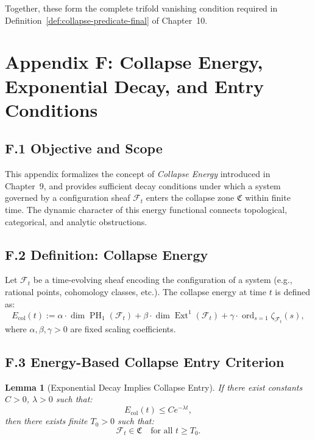 \documentclass[11pt]{article}
\newtheorem{lemma}[theorem]{Lemma}
\DeclareMathOperator{\Ext}{Ext}
\DeclareMathOperator{\PH}{PH}
\newcommand{\ord}{\operatorname{ord}}
\begin{document}
Together, these form the complete trifold vanishing condition required in Definition~\ref{def:collapse-predicate-final} of Chapter~10.



\appendix
\section*{Appendix F: Collapse Energy, Exponential Decay, and Entry Conditions}

\subsection*{F.1 Objective and Scope}

This appendix formalizes the concept of \emph{Collapse Energy} introduced in Chapter~9, and provides sufficient decay conditions under which a system governed by a configuration sheaf \( \mathcal{F}_t \) enters the collapse zone \( \mathfrak{C} \) within finite time. The dynamic character of this energy functional connects topological, categorical, and analytic obstructions.

\subsection*{F.2 Definition: Collapse Energy}

Let \( \mathcal{F}_t \) be a time-evolving sheaf encoding the configuration of a system (e.g., rational points, cohomology classes, etc.). The collapse energy at time \( t \) is defined as:
\[
E_{\mathrm{col}}(t) := \alpha \cdot \dim \PH_1(\mathcal{F}_t) + \beta \cdot \dim \Ext^1(\mathcal{F}_t) + \gamma \cdot \ord_{s=1} \zeta_{\mathcal{F}_t}(s),
\]
where \( \alpha, \beta, \gamma > 0 \) are fixed scaling coefficients.

\subsection*{F.3 Energy-Based Collapse Entry Criterion}

\begin{lemma}[Exponential Decay Implies Collapse Entry]
\label{lem:collapse-energy-decay}
If there exist constants \( C > 0 \), \( \lambda > 0 \) such that:
\[
E_{\mathrm{col}}(t) \leq C e^{-\lambda t},
\]
then there exists finite \( T_0 > 0 \) such that:
\[
\mathcal{F}_t \in \mathfrak{C} \quad \text{for all } t \geq T_0.
\]
\end{lemma}
\end{document}
